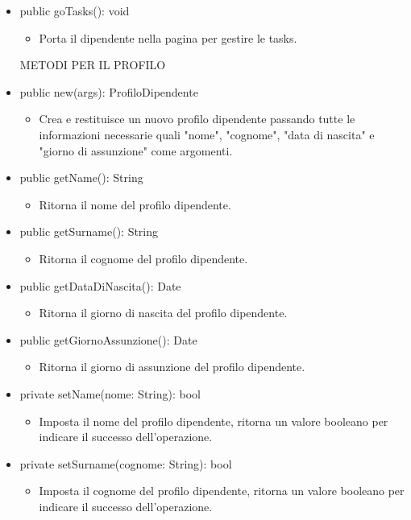 \documentclass{report}
\begin{document}
\begin{itemize}
\item public goTasks(): void
\begin{itemize}
    \item Porta il dipendente nella pagina per gestire le tasks.
\end{itemize}
\iffalse
METODI PER IL PROFILO
\item public new(args): ProfiloDipendente
\begin{itemize}
    \item Crea e restituisce un nuovo profilo dipendente passando tutte le informazioni necessarie quali "nome", "cognome", "data di nascita" e "giorno di assunzione" come argomenti.
\end{itemize}
\item public getName(): String
\begin{itemize}
    \item Ritorna il nome del profilo dipendente.
\end{itemize}
\item public getSurname(): String
\begin{itemize}
    \item Ritorna il cognome del profilo dipendente.
\end{itemize}
\item public getDataDiNascita(): Date
\begin{itemize}
    \item Ritorna il giorno di nascita del profilo dipendente.
\end{itemize}
\item public getGiornoAssunzione(): Date
\begin{itemize}
    \item Ritorna il giorno di assunzione del profilo dipendente.
\end{itemize}
\item private setName(nome: String): bool
\begin{itemize}
    \item Imposta il nome del profilo dipendente, ritorna un valore booleano per indicare il successo dell'operazione.
\end{itemize}
\item private setSurname(cognome: String): bool
\begin{itemize}
    \item Imposta il cognome del profilo dipendente, ritorna un valore booleano per indicare il successo dell'operazione.
\end{itemize}

\end{itemize}
\end{document}
